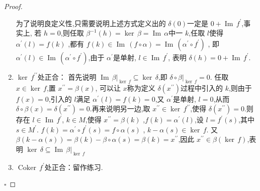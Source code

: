 \documentclass[../../几何与拓扑.tex]{subfiles}
\begin{document}
\begin{proof}
\begin{enumerate}
    
    为了说明良定义性,只需要说明上述方式定义出的 \(   \delta  \left( 0 \right)   \)一定是 \(  0+ \operatorname{Im}\,f^{\prime}   \),事实上,   若 \(  h = 0  \),则任取 \( \beta ^{-1} \left( h \right)=   \operatorname{ker}\,\beta =   \operatorname{Im}\,\alpha   \)中一 \(  k \),任取 \(  l   \)使得  \(  \alpha ^{\prime} \left( l \right)= f\left( k \right)    \) ,都有    \(  f\left( k \right) \in \operatorname{Im}\,\left( f\circ \alpha  \right)= \operatorname{Im}\,\left( \alpha ^{\prime} \circ f^{\prime}  \right)     \) ,
    即 \(  \alpha ^{\prime} \left( l \right) \in \operatorname{Im}\,\left( \alpha ^{\prime} \circ f^{\prime}  \right)    \),由于 \(  \alpha ^{\prime}   \)是单射, \(  l \in \operatorname{Im}\,f^{\prime}   \),   表明 \(   \delta  \left( h  \right) =  0+  \operatorname{Im}\,f^{\prime}    \).    
    
    \item \(  \operatorname{ker}\,f ^{\prime \prime}   \)处正合： 首先说明 \(  \operatorname{Im}\,\beta |_{\operatorname{ker}\,f}\subseteq \operatorname{ker}\, \delta    \),即 \(   \delta  \circ \beta |_{\operatorname{ker}\,f} = 0  \). 
    任取 \(  x \in  \operatorname{ker}\,f  \),置 \(  x ^{\prime \prime}  =  \beta \left( x \right)   \), 
   可以让 \(  x  \)称为定义 \(   \delta  \left( x ^{\prime \prime}  \right)   \)过程中引入的 \(  k  \),则由于 \(  f\left( x \right)= 0   \),引入的 \(  l  \)满足 \(  \alpha ^{\prime} \left( l \right)= f\left( k \right)= 0    \),又 \(  \alpha ^{\prime}   \)是单射, \(  l =  0  \),从而 \(    \delta  \circ \beta \left( x \right)=  \delta  \left( x ^{\prime \prime}  \right)= 0    \).再来说明另一边,取 \(  x ^{\prime \prime}  \in \operatorname{ker}\, f ^{\prime \prime}   \),使得 \(   \delta  \left( x ^{\prime \prime}  \right)= 0   \).则存在
    \(  l \in  \operatorname{Im}\,f^{\prime}   \), \(  k \in M  \),使得  \(  x ^{\prime \prime}  =  \beta \left( k \right)   \) ,\(  f\left( k \right)=  \alpha ^{\prime} \left( l \right)    \),设 \(  l =  f^{\prime} \left( s \right)   \),其中 \(  s \in M^{\prime}   \). 
     \(  f\left( k \right) =  \alpha ^{\prime} \circ f^{\prime} \left( s \right)= f\circ \alpha \left( s \right)     \)      , \(  k - \alpha \left( s \right) \in \operatorname{ker}\,f   \).
     又 \(   \beta \left( k- \alpha \left( s \right)  \right) =  \beta \left( k \right)- \beta \circ \alpha \left( s \right)=  \beta \left( k \right)=  x ^{\prime \prime}       \),因此 \(  x ^{\prime \prime}  \in  \beta \left( \operatorname{ker}\,f \right)   \),表明 \(  \operatorname{ker}\,  \delta  \subseteq \operatorname{Im}\,\beta |_{\operatorname{ker}\,f}  \)   
    \item \(  \operatorname{Coker}\,f^{\prime}   \)处正合：留作练习. 
  \end{enumerate}
  
       

    \hfill $\square$
\end{proof}
\end{document}
